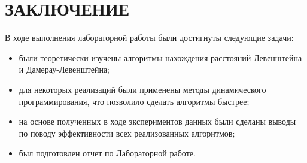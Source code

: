 \chapter*{ЗАКЛЮЧЕНИЕ}

В ходе выполнения лабораторной работы были достигнуты следующие задачи:

\begin{itemize}
    \item были теоретически изучены алгоритмы нахождения расстояний Левенштейна и Дамерау-Левенштейна;
    \item для некоторых реализаций были применены методы динамического программирования, что позволило сделать алгоритмы быстрее;
    \item на основе полученных в ходе экспериментов данных были сделаны выводы по поводу эффективности всех реализованных алгоритмов;
    \item был подготовлен отчет по Лабораторной работе.
\end{itemize}
